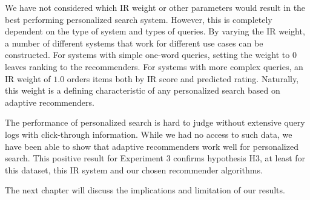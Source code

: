 

We have not considered which IR weight or other parameters would result in the best performing
personalized search system.
However, this is completely dependent on the type of system and types of queries.
By varying the IR weight, a number of different systems that work for different use cases
can be constructed. For systems with simple one-word queries, setting the weight
to $0$ leaves ranking to the recommenders.
For systems with more complex queries, an IR weight of $1.0$ 
orders items both by IR score and predicted rating.
Naturally, this weight is a defining characteristic of any 
personalized search based on adaptive recommenders.

The performance of personalized search is hard to judge without
extensive query logs with click-through information.
While we had no access to such data, 
we have been able to show that adaptive recommenders
work well for personalized search.
This positive result for Experiment 3 confirms hypothesis H3,
at least for this dataset, this IR system and our chosen recommender algorithms.

The next chapter will discuss the implications and limitation of our results.


